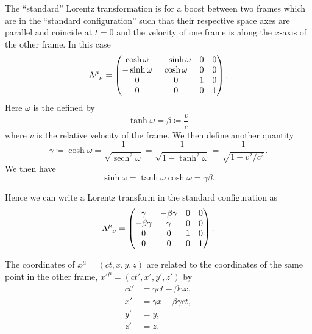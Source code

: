 \documentclass[fleqn]{NotesClass}
\DeclareMathOperator{\sech}{sech}
\begin{document}
    The \enquote{standard} Lorentz transformation is for a boost between two frames which are in the \enquote{standard configuration} such that their respective space axes are parallel and coincide at \(t = 0\) and the velocity of one frame is along the \(x\)-axis of the other frame.
    In this case
    \begin{equation}
        \tensor{\Lambda}{^\mu_\nu} = 
        \begin{pmatrix}
            \cosh \omega & -\sinh\omega & 0 & 0\\
            -\sinh\omega & \cosh \omega & 0 & 0\\
            0 & 0 & 1 & 0\\
            0 & 0 & 0 & 1
        \end{pmatrix}
        .
    \end{equation}
    Here \(\omega\) is the  defined by
    \begin{equation}
        \tanh \omega = \beta \coloneqq \frac{v}{c}
    \end{equation}
    where \(v\) is the relative velocity of the frame.
    We then define another quantity
    \begin{equation}
        \gamma \coloneqq \cosh\omega = \frac{1}{\sqrt{\sech^2 \omega}} = \frac{1}{\sqrt{1 - \tanh^2\omega}} = \frac{1}{\sqrt{1 - v^2/c^2}}.
    \end{equation}
    We then have
    \begin{equation}
        \sinh\omega = \tanh\omega\cosh\omega = \gamma\beta.
    \end{equation}
    
    Hence we can write a Lorentz transform in the standard configuration as
    \begin{equation}
        \tensor{\Lambda}{^\mu_\nu} =
        \begin{pmatrix}
            \gamma & -\beta\gamma & 0 & 0\\
            -\beta\gamma & \gamma & 0 & 0\\
            0 & 0 & 1 & 0\\
            0 & 0 & 0 & 1
        \end{pmatrix}
        .
    \end{equation}
    
    The coordinates of \(x^\mu = (ct, x, y, z)\) are related to the coordinates of the same point in the other frame, \(x'^\mu = (ct', x', y', z')\) by
    \begin{align}
        ct' &= \gamma ct - \beta\gamma x,\\
        x' &= \gamma x - \beta\gamma ct,\\
        y' &= y,\\
        z' &= z.
    \end{align}
    
\end{document}
